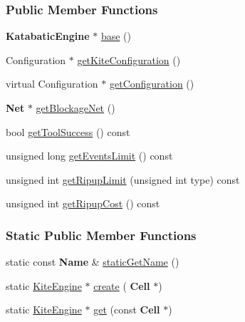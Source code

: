 \subsubsection*{Public Member Functions}
\begin{DoxyCompactItemize}
\item 
\textbf{ Katabatic\+Engine} $\ast$ \mbox{\hyperlink{classKite_1_1KiteEngine_a2313df62af32702cf749c15d349af5ea}{base}} ()
\item 
Configuration $\ast$ \mbox{\hyperlink{classKite_1_1KiteEngine_a1af1f95e771fba5c85a19ea2d686553a}{get\+Kite\+Configuration}} ()
\item 
virtual Configuration $\ast$ \mbox{\hyperlink{classKite_1_1KiteEngine_a9a7fbadfe526875680f698c76adfb128}{get\+Configuration}} ()
\item 
\textbf{ Net} $\ast$ \mbox{\hyperlink{classKite_1_1KiteEngine_aef6f41b0e8265ad574d1797f46ab9fa8}{get\+Blockage\+Net}} ()
\item 
bool \mbox{\hyperlink{classKite_1_1KiteEngine_ae88a4ccf0189655c785df38e5d75155c}{get\+Tool\+Success}} () const
\item 
unsigned long \mbox{\hyperlink{classKite_1_1KiteEngine_abb19e465ef249651bfc0efbe6f23ef1d}{get\+Events\+Limit}} () const
\item 
unsigned int \mbox{\hyperlink{classKite_1_1KiteEngine_aa9cc4f640a8b50dc1bcff8d938a09c3c}{get\+Ripup\+Limit}} (unsigned int type) const
\item 
unsigned int \mbox{\hyperlink{classKite_1_1KiteEngine_a1b4de41d8359251bcfbda288ec6bbbee}{get\+Ripup\+Cost}} () const
\end{DoxyCompactItemize}
\subsubsection*{Static Public Member Functions}
\begin{DoxyCompactItemize}
\item 
static const \textbf{ Name} \& \mbox{\hyperlink{classKite_1_1KiteEngine_a802eee6265da8d536db52d412f8a4afd}{static\+Get\+Name}} ()
\item 
static \mbox{\hyperlink{classKite_1_1KiteEngine}{Kite\+Engine}} $\ast$ \mbox{\hyperlink{classKite_1_1KiteEngine_a520d92a22c1becdc0fbbec927365db21}{create}} (\textbf{ Cell} $\ast$)
\item 
static \mbox{\hyperlink{classKite_1_1KiteEngine}{Kite\+Engine}} $\ast$ \mbox{\hyperlink{classKite_1_1KiteEngine_a9905ab1f7a970bc947adb8ddf54e55e1}{get}} (const \textbf{ Cell} $\ast$)
\end{DoxyCompactItemize}


